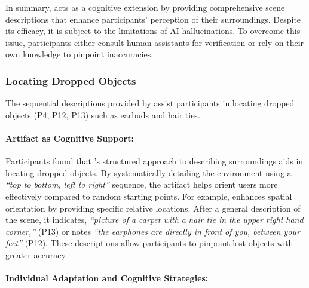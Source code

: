 In summary, \bma{} acts as a cognitive extension by providing comprehensive scene descriptions that enhance participants' perception of their surroundings. Despite its efficacy, it is subject to the limitations of AI hallucinations. To overcome this issue, participants either consult human assistants for verification or rely on their own knowledge to pinpoint inaccuracies.



\subsubsection{Locating Dropped Objects}
\label{locate_object}
The sequential descriptions provided by \bma{} assist participants in locating dropped objects (P4, P12, P13) such as earbuds and hair ties. 



\paragraph{Artifact as Cognitive Support:}
Participants found that \bma's structured approach to describing surroundings aids in locating dropped objects. By systematically detailing the environment using a \textit{``top to bottom, left to right''} sequence, the artifact helps orient users more effectively compared to random starting points. 
% 
For example, \bma{} enhances spatial orientation by providing specific relative locations. After a general description of the scene, it indicates, \textit{``picture of a carpet with a hair tie in the upper right hand corner,''} (P13) or notes 
\textit{``the earphones are directly in front of you, between your feet''} (P12). 
These descriptions allow participants to pinpoint lost objects with greater accuracy.



\paragraph{Individual Adaptation and Cognitive Strategies:}

